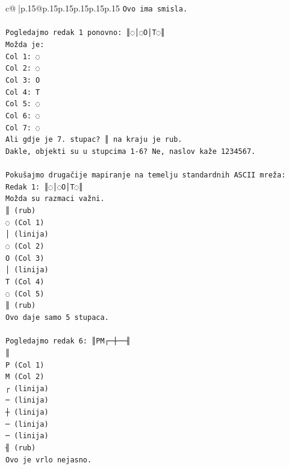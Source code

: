 \documentclass{article}
\begin{document}
{\begin{supertabular}{c@{$\;$}|p{.15\linewidth}@{}p{.15\linewidth}p{.15\linewidth}p{.15\linewidth}p{.15\linewidth}p{.15\linewidth}}
{{{\texttt{Ovo ima smisla.} \\
\\ 
\texttt{Pogledajmo redak 1 ponovno: ║◌│◌O│T◌║} \\
\texttt{Možda je:} \\
\texttt{Col 1: ◌} \\
\texttt{Col 2: ◌} \\
\texttt{Col 3: O} \\
\texttt{Col 4: T} \\
\texttt{Col 5: ◌} \\
\texttt{Col 6: ◌} \\
\texttt{Col 7: ◌} \\
\texttt{Ali gdje je 7. stupac? ║ na kraju je rub.} \\
\texttt{Dakle, objekti su u stupcima 1{-}6? Ne, naslov kaže 1234567.} \\
\\ 
\texttt{Pokušajmo drugačije mapiranje na temelju standardnih ASCII mreža:} \\
\texttt{Redak 1: ║◌│◌O│T◌║} \\
\texttt{Možda su razmaci važni.} \\
\texttt{║ (rub)} \\
\texttt{◌ (Col 1)} \\
\texttt{│ (linija)} \\
\texttt{◌ (Col 2)} \\
\texttt{O (Col 3)} \\
\texttt{│ (linija)} \\
\texttt{T (Col 4)} \\
\texttt{◌ (Col 5)} \\
\texttt{║ (rub)} \\
\texttt{Ovo daje samo 5 stupaca.} \\
\\ 
\texttt{Pogledajmo redak 6: ║PM┌─┼──╢} \\
\texttt{║} \\
\texttt{P (Col 1)} \\
\texttt{M (Col 2)} \\
\texttt{┌ (linija)} \\
\texttt{─ (linija)} \\
\texttt{┼ (linija)} \\
\texttt{─ (linija)} \\
\texttt{─ (linija)} \\
\texttt{╢ (rub)} \\
\texttt{Ovo je vrlo nejasno.} \\
\\ 
}}}
\end{supertabular}}
\end{document}
